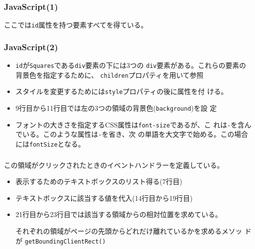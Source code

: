 \begin{frame}[containsverbatim]
\frametitle{JavaScript(1)}
ここでは\texttt{id}属性を持つ要素すべてを得ている。
\end{frame}
\begin{frame}[containsverbatim]
\frametitle{JavaScript(2)}
\begin{itemize}
 \item \texttt{id}が\texttt{Squares}である\texttt{div}要素の下には3つの
 \texttt{div}要素がある。これらの要素の背景色を指定するために、
 \texttt{children}プロパティを用いて参照
 \item スタイルを変更するためには\texttt{style}プロパティの後に属性を付
       ける。
 \item 9行目から11行目では左の3つの領域の背景色(\texttt{background})を設
       定
 \item フォントの大きさを指定するCSS属性は\texttt{font-size}であるが、こ
       れは\texttt{-}を含んでいる。このような属性は\texttt{-}を省き、次
       の単語を大文字で始める。この場合には\texttt{fontSize}となる。
\end{itemize}
\end{frame}
\begin{frame}[containsverbatim]
\frametitle{}
この領域がクリックされたときのイベントハンドラーを定義している。
\begin{itemize}
 \item 表示するためのテキストボックスのリスト得る(7行目)
 \item テキストボックスに該当する値を代入(14行目から19行目)
 \item 21行目から23行目では該当する領域からの相対位置を求めている。
       
       それぞれの領域がページの先頭からどれだけ離れているかを求めるメソッ
       ドが \texttt{getBoundingClientRect()}
\end{itemize}
\end{frame}

